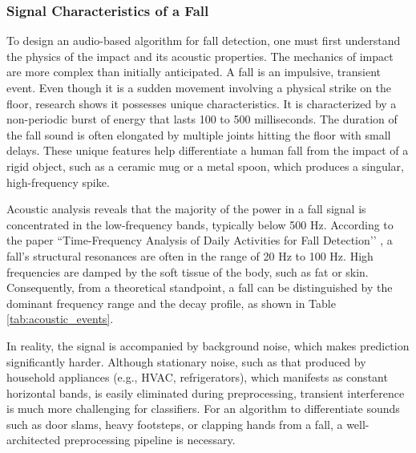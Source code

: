 \documentclass[11pt, a4paper, twoside]{article}
\begin{document}
\subsubsection{Signal Characteristics of a Fall}
\label{sec:signal}
To design an audio-based algorithm for fall detection, one must first understand the physics of the impact and its acoustic properties. The mechanics of impact are more complex than initially anticipated. A fall is an impulsive, transient event. Even though it is a sudden movement involving a physical strike on the floor, research shows it possesses unique characteristics. It is characterized by a non-periodic burst of energy that lasts 100 to 500 milliseconds. The duration of the fall sound is often elongated by multiple joints hitting the floor with small delays. These unique features help differentiate a human fall from the impact of a rigid object, such as a ceramic mug or a metal spoon, which produces a singular, high-frequency spike.

Acoustic analysis reveals that the majority of the power in a fall signal is concentrated in the low-frequency bands, typically below 500 Hz. According to the paper ``Time-Frequency Analysis of Daily Activities for Fall Detection’’ \cite{huynh2021time}, a fall’s structural resonances are often in the range of 20 Hz to 100 Hz. High frequencies are damped by the soft tissue of the body, such as fat or skin. Consequently, from a theoretical standpoint, a fall can be distinguished by the dominant frequency range and the decay profile, as shown in Table \ref{tab:acoustic_events}.

In reality, the signal is accompanied by background noise, which makes prediction significantly harder. Although stationary noise, such as that produced by household appliances (e.g., HVAC, refrigerators), which manifests as constant horizontal bands, is easily eliminated during preprocessing, transient interference is much more challenging for classifiers. For an algorithm to differentiate sounds such as door slams, heavy footsteps, or clapping hands from a fall, a well-architected preprocessing pipeline is necessary.
\end{document}
